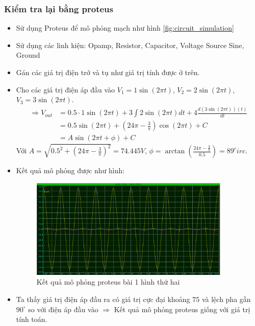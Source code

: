 			\subsubsection{Kiểm tra lại bằng proteus}
				\begin{itemize}
					\item Sử dụng Proteus để mô phỏng mạch như hình \ref{fig:circuit_simulation}
					\item Sử dụng các linh kiện: Opamp, Resistor, Capacitor, Voltage Source Sine, Ground
					\item Gán các giá trị điện trở và tụ như giá trị tính được ở trên.
					\item Cho các giá trị điện áp đầu vào $V_1 = 1\sin(2\pi t)$, $V_2 = 2\sin(2\pi t)$, $V_3 = 3\sin(2\pi t)$. 
					\begin{align*}
						\Rightarrow V_{out} &= 0.5 \cdot 1\sin(2\pi t) + 3 \int 2\sin(2\pi t) dt + 4 \frac{d(3\sin(2\pi t))(t)}{dt} \\
						&= 0.5\sin(2\pi t) + (24 \pi - \frac{3}{\pi})\cos(2\pi t) + C \\
						&= A\sin(2 \pi t + \phi)  + C
					\end{align*}
					\hspace*{0.6cm} Với $A = \sqrt{0.5^2 + (24 \pi - \frac{3}{\pi})^2} = 74.445 V$, $\phi = \arctan(\frac{24 \pi - \frac{3}{\pi}}{0.5}) = 89 ^circ$.
					\item Kết quả mô phỏng được như hình:
					\begin{figure}[H]
						\centering
						\includegraphics[width=0.9\textwidth]{pictures/result1_b.png}
						\caption{Kết quả mô phỏng proteus bài 1 hình thứ hai}					
					\end{figure}
					\item Ta thấy giá trị điện áp đầu ra có giá trị cực đại khoảng $75$ và lệch pha gần $90^{\circ}$ so với điện áp đầu vào $\Rightarrow$ Kết quả mô phỏng proteus giống với giá trị tính toán.
					
				\end{itemize}
		
		